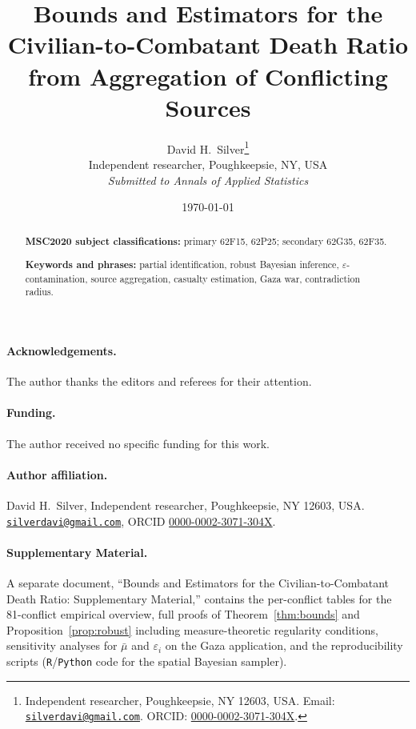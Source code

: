 \documentclass[12pt,a4paper]{article}
\title{\textbf{Bounds and Estimators for the Civilian-to-Combatant Death Ratio\\ from Aggregation of Conflicting Sources}}
\author{David H.\ Silver\thanks{Independent researcher, Poughkeepsie, NY 12603, USA. Email: \href{mailto:silverdavi@gmail.com}{\texttt{silverdavi@gmail.com}}. ORCID: \href{https://orcid.org/0000-0002-3071-304X}{0000-0002-3071-304X}.}\\
  \small Independent researcher, Poughkeepsie, NY, USA\\[2pt]
  \small\emph{Submitted to Annals of Applied Statistics}}
\date{\today}
\theoremstyle{plain}
\theoremstyle{definition}
\theoremstyle{remark}
\begin{document}
\maketitle

\begin{abstract}


\bigskip
\noindent\textbf{MSC2020 subject classifications:} primary 62F15, 62P25; secondary 62G35, 62F35.

\noindent\textbf{Keywords and phrases:} partial identification, robust Bayesian inference, $\varepsilon$-contamination, source aggregation, casualty estimation, Gaza war, contradiction radius.
\end{abstract}










\paragraph{Acknowledgements.} The author thanks the editors and referees for their attention.

\paragraph{Funding.} The author received no specific funding for this work.

\paragraph{Author affiliation.}
\noindent David H.\ Silver, Independent researcher, Poughkeepsie, NY 12603, USA.\\
\href{mailto:silverdavi@gmail.com}{\texttt{silverdavi@gmail.com}}, ORCID \href{https://orcid.org/0000-0002-3071-304X}{0000-0002-3071-304X}.

\paragraph{Supplementary Material.} A separate document, ``Bounds and Estimators for the Civilian-to-Combatant Death Ratio: Supplementary Material,'' contains the per-conflict tables for the 81-conflict empirical overview, full proofs of Theorem~\ref{thm:bounds} and Proposition~\ref{prop:robust} including measure-theoretic regularity conditions, sensitivity analyses for $\bar\mu$ and $\varepsilon_i$ on the Gaza application, and the reproducibility scripts (\texttt{R}/\texttt{Python} code for the spatial Bayesian sampler).


\end{document}
